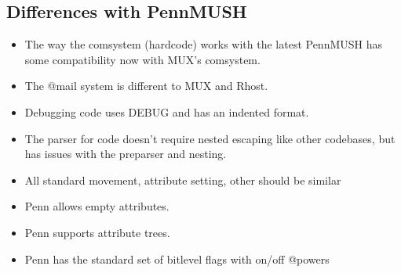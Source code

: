 \documentclass[letterpaper,10pt,english]{sphinxmanual}
\begin{document}
\subsection{Differences with PennMUSH}
\label{\detokenize{differences:differences-with-pennmush}}\begin{itemize}
\item {} 
\sphinxAtStartPar
The way the comsystem (hardcode) works with the latest PennMUSH has some
compatibility now with MUX’s comsystem.

\item {} 
\sphinxAtStartPar
The @mail system is different to MUX and Rhost.

\item {} 
\sphinxAtStartPar
Debugging code uses DEBUG and has an indented format.

\item {} 
\sphinxAtStartPar
The parser for code doesn’t require nested escaping like other codebases, but has issues with the pre\sphinxhyphen{}parser and nesting.

\item {} 
\sphinxAtStartPar
All standard movement, attribute setting, other should be similar

\item {} 
\sphinxAtStartPar
Penn allows empty attributes.

\item {} 
\sphinxAtStartPar
Penn supports attribute trees.

\item {} 
\sphinxAtStartPar
Penn has the standard set of bitlevel flags with on/off @powers

\end{itemize}
\end{document}
